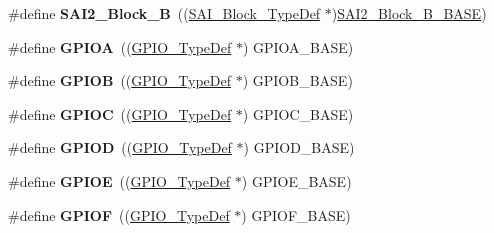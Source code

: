 \begin{DoxyCompactItemize}
\item 
\mbox{\label{group___peripheral__declaration_ga95b7e0dbc95a105899223988e999c799}} 
\#define {\bfseries S\+A\+I2\+\_\+\+Block\+\_\+B}~((\mbox{\hyperlink{struct_s_a_i___block___type_def}{S\+A\+I\+\_\+\+Block\+\_\+\+Type\+Def}} $\ast$)\mbox{\hyperlink{group___peripheral__memory__map_ga034a6ac8f61e4d15cd9f2f7eca140569}{S\+A\+I2\+\_\+\+Block\+\_\+\+B\+\_\+\+B\+A\+SE}})
\item 
\mbox{\label{group___peripheral__declaration_gac485358099728ddae050db37924dd6b7}} 
\#define {\bfseries G\+P\+I\+OA}~((\mbox{\hyperlink{struct_g_p_i_o___type_def}{G\+P\+I\+O\+\_\+\+Type\+Def}} $\ast$) G\+P\+I\+O\+A\+\_\+\+B\+A\+SE)
\item 
\mbox{\label{group___peripheral__declaration_ga68b66ac73be4c836db878a42e1fea3cd}} 
\#define {\bfseries G\+P\+I\+OB}~((\mbox{\hyperlink{struct_g_p_i_o___type_def}{G\+P\+I\+O\+\_\+\+Type\+Def}} $\ast$) G\+P\+I\+O\+B\+\_\+\+B\+A\+SE)
\item 
\mbox{\label{group___peripheral__declaration_ga2dca03332d620196ba943bc2346eaa08}} 
\#define {\bfseries G\+P\+I\+OC}~((\mbox{\hyperlink{struct_g_p_i_o___type_def}{G\+P\+I\+O\+\_\+\+Type\+Def}} $\ast$) G\+P\+I\+O\+C\+\_\+\+B\+A\+SE)
\item 
\mbox{\label{group___peripheral__declaration_ga7580b1a929ea9df59725ba9c18eba6ac}} 
\#define {\bfseries G\+P\+I\+OD}~((\mbox{\hyperlink{struct_g_p_i_o___type_def}{G\+P\+I\+O\+\_\+\+Type\+Def}} $\ast$) G\+P\+I\+O\+D\+\_\+\+B\+A\+SE)
\item 
\mbox{\label{group___peripheral__declaration_gae04bdb5e8acc47cab1d0532e6b0d0763}} 
\#define {\bfseries G\+P\+I\+OE}~((\mbox{\hyperlink{struct_g_p_i_o___type_def}{G\+P\+I\+O\+\_\+\+Type\+Def}} $\ast$) G\+P\+I\+O\+E\+\_\+\+B\+A\+SE)
\item 
\mbox{\label{group___peripheral__declaration_ga43c3022dede7c9db7a58d3c3409dbc8d}} 
\#define {\bfseries G\+P\+I\+OF}~((\mbox{\hyperlink{struct_g_p_i_o___type_def}{G\+P\+I\+O\+\_\+\+Type\+Def}} $\ast$) G\+P\+I\+O\+F\+\_\+\+B\+A\+SE)

\end{DoxyCompactItemize}
